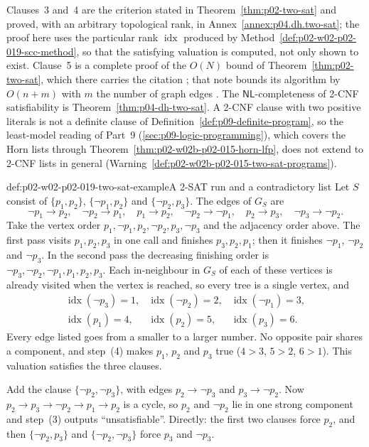 Clauses~3 and~4 are the criterion stated in Theorem~\ref{thm:p02-two-sat} and
proved, with an arbitrary topological rank, in Annex~\ref{annex:p04.dh.two-sat};
the proof here uses the particular rank \(\operatorname{idx}\) produced by
Method~\ref{def:p02-w02-p02-019-scc-method}, so that the satisfying valuation is
computed, not only shown to exist.  Clause~5 is a complete proof of the
\(O(N)\) bound of Theorem~\ref{thm:p02-two-sat}, which there carries the
citation \cite[thm.~1, p.~122]{AspvallPlassTarjan1979}; that note bounds its
algorithm by \(O(n+m)\) with \(m\) the number of graph edges
\cite[123]{AspvallPlassTarjan1979}.  The \(\mathsf{NL}\)-completeness of
2-CNF satisfiability is Theorem~\ref{thm:p04-dh-two-sat}.  A 2-CNF clause
with two positive literals is not a definite clause of
Definition~\ref{def:p09-definite-program}, so the least-model reading of
Part~9 (\cref{sec:p09-logic-programming}), which covers the Horn lists through
Theorem~\ref{thm:p02-w02b-p02-015-horn-lfp}, does not extend to 2-CNF lists
in general (Warning~\ref{def:p02-w02b-p02-015-two-sat-programs}).

\begin{hbexample}{def:p02-w02-p02-019-two-sat-example}{A 2-SAT run and a contradictory list}
Let \(S\) consist of \(\{p_1,p_2\}\), \(\{\neg p_1,p_2\}\) and
\(\{\neg p_2,p_3\}\).  The edges of \(G_S\) are
\[
 \neg p_1\to p_2,\quad \neg p_2\to p_1,\quad
 p_1\to p_2,\quad \neg p_2\to\neg p_1,\quad
 p_2\to p_3,\quad \neg p_3\to\neg p_2.
\]
Take the vertex order \(p_1,\neg p_1,p_2,\neg p_2,p_3,\neg p_3\) and the
adjacency order above.  The first pass visits \(p_1,p_2,p_3\) in one call and
finishes \(p_3,p_2,p_1\); then it finishes \(\neg p_1\), \(\neg p_2\) and
\(\neg p_3\).  In the second pass the decreasing finishing order is
\(\neg p_3,\neg p_2,\neg p_1,p_1,p_2,p_3\).  Each in-neighbour in \(G_S\) of
each of these vertices is already visited when the vertex is reached, so every
tree is a single vertex, and
\[
 \begin{array}{lll}
 \operatorname{idx}(\neg p_3)=1, & \operatorname{idx}(\neg p_2)=2, &
 \operatorname{idx}(\neg p_1)=3,\\
 \operatorname{idx}(p_1)=4, & \operatorname{idx}(p_2)=5, &
 \operatorname{idx}(p_3)=6.
 \end{array}
\]
Every edge listed goes from a smaller to a larger number.  No opposite pair
shares a component, and step~(4) makes \(p_1\), \(p_2\) and \(p_3\) true
(\(4>3\), \(5>2\), \(6>1\)).  This valuation satisfies the three clauses.

Add the clause \(\{\neg p_2,\neg p_3\}\), with edges \(p_2\to\neg p_3\) and
\(p_3\to\neg p_2\).  Now
\(p_2\to p_3\to\neg p_2\to p_1\to p_2\) is a cycle, so \(p_2\) and
\(\neg p_2\) lie in one strong component and step~(3) outputs
``unsatisfiable''.  Directly: the first two clauses force \(p_2\), and then
\(\{\neg p_2,p_3\}\) and \(\{\neg p_2,\neg p_3\}\) force \(p_3\) and
\(\neg p_3\).
\end{hbexample}

